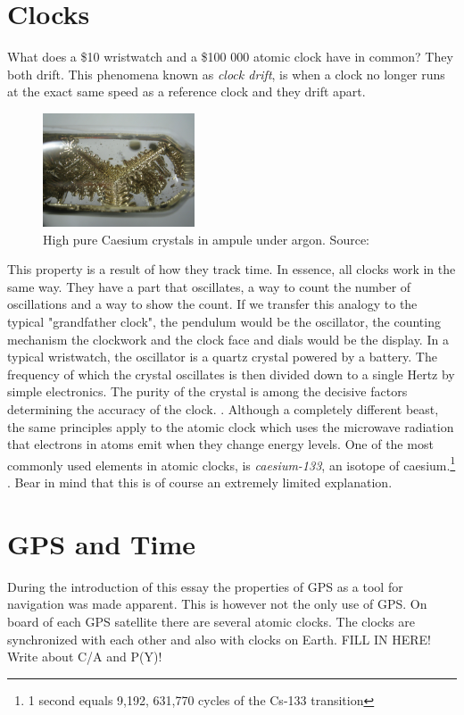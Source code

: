 \documentclass[12pt,english,a4paper]{article}
\begin{document}
\section{Clocks}
What does a \$10 wristwatch and a \$100 000 atomic clock have in common? They both drift. This phenomena known as \textit{clock drift}, is when a clock no longer runs at the exact same speed as a reference clock and they drift apart.
\begin{figure}
  \centering
  \includegraphics[width=0.40\textwidth]{cscrystals.jpg}
  \caption[Caesium campule]
   {High pure Caesium crystals in ampule under argon. Source: \cite{DENCES}}
\end{figure} 
This property is a result of how they track time. In essence, all clocks work in the same way. They have a part that oscillates, a way to count the number of oscillations and a way to show the count. If we transfer this analogy to the typical "grandfather clock", the pendulum would be the oscillator, the counting mechanism the clockwork and the clock face and dials would be the display. In a typical wristwatch, the oscillator is a quartz crystal powered by a battery. The frequency of which the crystal oscillates is then divided down to a single Hertz by simple electronics. The purity of the crystal is among the decisive factors determining the accuracy of the clock. \cite{CSMG}. 
Although a completely different beast, the same principles apply to the atomic clock which uses the microwave radiation that electrons in atoms emit when they change energy levels. One of the most commonly used elements in atomic clocks, is \textit{caesium-133}, an isotope of caesium.\footnote{1 second equals 9,192, 631,770 cycles of the Cs-133 transition} \cite{HP}. Bear in mind that this is of course an extremely limited explanation.

\section{GPS and Time}
During the introduction of this essay the properties of GPS as a tool for navigation was made apparent. This is however not the only use of GPS. On board of each GPS satellite there are several atomic clocks. The clocks are synchronized with each other and also with clocks on Earth. FILL IN HERE! Write about C/A and P(Y)!
\end{document}
